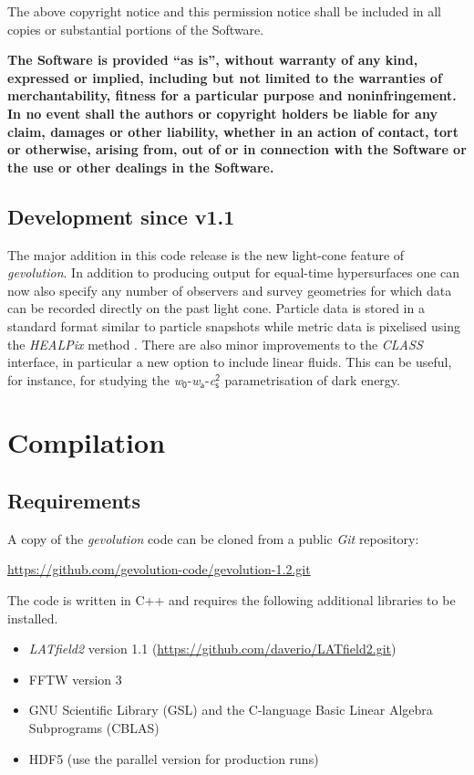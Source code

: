 \documentclass[a4paper,10pt]{article}
\begin{document}
The above copyright notice and this permission notice shall be included in
all copies or substantial portions of the Software.
  
\textbf{The Software is provided ``as is'', without warranty of any kind, expressed or
implied, including but not limited to the warranties of merchantability,
fitness for a particular purpose and noninfringement. In no event shall the
authors or copyright holders be liable for any claim, damages or other
liability, whether in an action of contact, tort or otherwise, arising from,
out of or in connection with the Software or the use or other dealings in
the Software.}

\subsection{Development since v1.1}

The major addition in this code release is the new light-cone feature of \textit{gevolution}. In addition to producing output for equal-time
hypersurfaces one can now also specify any number of observers and survey geometries for which data can be recorded directly on the past light cone.
Particle data is stored in a standard format similar to particle snapshots while metric data is pixelised using the \textit{HEALPix}
method \cite{Gorski:2004by}.
There are also minor improvements to the \textit{CLASS} interface, in particular a new option to include linear fluids. This can be useful, for instance,
for studying the \textit{w}$_\mathsf{0}$-\textit{w}$_\mathsf{a}$-\textit{c}$_\mathsf{s}^\mathsf{2}$ parametrisation of dark energy.


\section{Compilation}

\subsection{Requirements}

A copy of the \textit{gevolution} code can be cloned from a public \textit{Git} repository:

\url{https://github.com/gevolution-code/gevolution-1.2.git}

\noindent The code is written in C++ and requires the following additional libraries to be installed.

\begin{itemize}
 \item \textit{LATfield2} version 1.1 (\url{https://github.com/daverio/LATfield2.git})
 \item FFTW version 3
 \item GNU Scientific Library (GSL) and the C-language Basic Linear Algebra Subprograms (CBLAS)
 \item HDF5 (use the parallel version for production runs)
\end{itemize}
\end{document}
